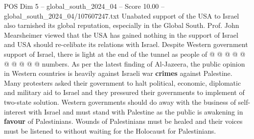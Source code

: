 \begin{textsample}{POS Dim 5 – global\_south\_2024\_04 – Score 10.00 – global\_south\_2024\_04/107607247.txt}
Unabated support of the USA to Israel also tarnished its global reputation, especially in the Global South.
Prof.
John Mearsheimer viewed that the USA has gained nothing in the support of Israel and USA should re-celibate its relations with Israel.
Despite Western government support of Israel, there is light at the end of the tunnel as people of @ @ @ @ @ @ @ @ @ @ numbers.
As per the latest finding of Al-Jazeera, the public opinion in Western countries is heavily against Israeli war \textbf{crimes} against Palestine.
Many protesters asked their government to halt political, economic, diplomatic and military aid to Israel and they pressured their governments to implement of two-state solution.
Western governments should do away with the business of self-interest with Israel and must stand with Palestine as the public is awakening in \textbf{favour} of Palestinians.
Wounds of Palestinians must be healed and their voices must be listened to without waiting for the Holocaust for Palestinians.

\end{textsample}
